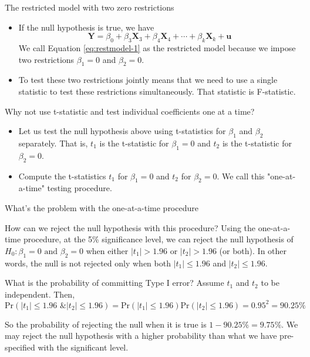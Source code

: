 \documentclass[presentation,10pt]{beamer}
\newcommand{\pr}{\mathrm{Pr}}
\begin{document}
\begin{frame}[label={sec:org19830fd}]{The restricted model with two zero restrictions}
\begin{itemize}
\item If the null hypothesis is true, we have
\begin{equation}
\label{eq:restmodel-1}
\mathbf{Y} = \beta_0 + \beta_3 \mathbf{X}_3 + \beta_4 \mathbf{X}_4 + \cdots + \beta_k \mathbf{X}_k + \mathbf{u}
\end{equation}
We call Equation \eqref{eq:restmodel-1} as \alert{the restricted model}
because we impose two restrictions \(\beta_1 = 0\) and \(\beta_2 = 0\).

\item To test these two restrictions jointly means that we need to use a
single statistic to test these restrictions simultaneously. That
statistic is F-statistic.
\end{itemize}
\end{frame}

\begin{frame}[label={sec:org5f69dd5}]{Why not use t-statistic and test individual coefficients one at a time?}
\begin{itemize}
\item Let us test the null hypothesis above using t-statistics for \(\beta_1\)
and \(\beta_2\) separately. That is, \(t_1\) is the t-statistic for
\(\beta_1 = 0\) and \(t_2\) is the t-statistic for \(\beta_2 = 0\). \vspace{0.2cm}

\item Compute the t-statistics \(t_1\) for \(\beta_1 = 0\) and \(t_2\) for
\(\beta_2 = 0\). We call this "one-at-a-time" testing procedure.
\end{itemize}
\end{frame}

\begin{frame}[label={sec:org3ebaecf}]{What's the problem with the one-at-a-time procedure}
\begin{block}{How can we reject the null hypothesis with this procedure?}
Using the one-at-a-time procedure, at the 5\% significance level, we
can reject the null hypothesis of \(H_0: \beta_1 = 0 \text{ and }
  \beta_2 = 0\) when either \(|t_1| > 1.96\) or \(|t_2| > 1.96\) (or
both). In other words, the null is not rejected only when both
\(|t_1| \leq 1.96\) and \(|t_2| \leq 1.96\).
\end{block}

\begin{block}{What is the probability of committing Type I error?}
Assume \(t_1\) and \(t_2\) to be independent. Then,
\[\pr(|t_1| \leq 1.96 \text{ \& } |t_2| \leq 1.96) = \pr(|t_1| \leq
  1.96) \pr(|t_2| \leq 1.96) = 0.95^2 = 90.25\%\]

So the probability of rejecting the null when it is true is \(1 -
  90.25\% = 9.75\%\). We may reject the null hypothesis with a higher
probability than what we have pre-specified with the significant
level.
\end{block}
\end{frame}
\end{document}
